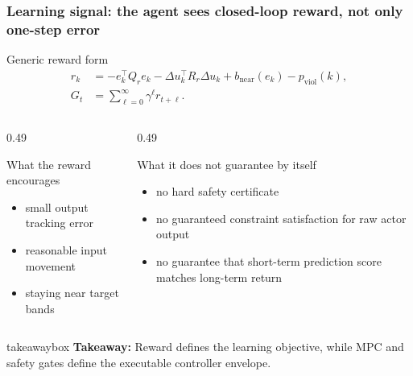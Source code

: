 \documentclass[aspectratio=169]{beamer}
\newcommand{\takeawaybox}[1]{%
\vspace{0.02cm}
\begin{center}
\begin{beamercolorbox}[wd=0.94\textwidth,sep=3pt,center,rounded=true,shadow=false]{takeawaybox}
\scriptsize
\textbf{\textcolor{maroon1}{Takeaway:}} #1
\end{beamercolorbox}
\end{center}
}
\begin{document}
\begin{frame}
\frametitle{\large \textbf{Learning signal: the agent sees closed-loop reward, not only one-step error}}
\scriptsize

\begin{block}{Generic reward form}
\begin{align*}
r_k &=
- e_k^{\top}Q_r e_k
- \Delta u_k^{\top}R_r\Delta u_k
+ b_{\mathrm{near}}(e_k)
- p_{\mathrm{viol}}(k),\\
G_t &= \sum_{\ell=0}^{\infty}\gamma^\ell r_{t+\ell}.
\end{align*}
\end{block}

\begin{columns}[T,onlytextwidth]
\begin{column}{0.49\textwidth}
\begin{block}{What the reward encourages}
\begin{itemize}\justifying
  \setlength\itemsep{0.25ex}
  \item small output tracking error
  \item reasonable input movement
  \item staying near target bands
\end{itemize}
\end{block}
\end{column}
\begin{column}{0.49\textwidth}
\begin{block}{What it does not guarantee by itself}
\begin{itemize}\justifying
  \setlength\itemsep{0.25ex}
  \item no hard safety certificate
  \item no guaranteed constraint satisfaction for raw actor output
  \item no guarantee that short-term prediction score matches long-term return
\end{itemize}
\end{block}
\end{column}
\end{columns}

\takeawaybox{Reward defines the learning objective, while MPC and safety gates define the executable controller envelope.}
\end{frame}
\end{document}
